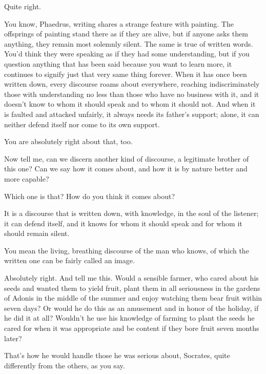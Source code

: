 \sayphaedrus Quite right.

\saysocrates You know, Phaedrus, writing shares a strange feature with
painting. The offsprings of painting stand there as if they are alive,
but if anyone asks them anything, they remain most solemnly silent. The
same is true of written words. You'd think they were speaking as if they
had some understanding, but if you question anything that has been said
because you want to learn more, it continues to signify just that very
same thing forever. When it has once been written down, every
discourse roams about everywhere, reaching indiscriminately those with
understanding no less than those who have no business with it, and it
doesn't know to whom it should speak and to whom it should not. And when
it is faulted and attacked unfairly, it always needs its father's
support; alone, it can neither defend itself nor come to its own
support.

\sayphaedrus You are absolutely right about that, too.

\saysocrates Now tell me, can we discern another kind of
discourse, a legitimate brother of this one? Can we say how it comes
about, and how it is by nature better and more capable?

\sayphaedrus Which one is that? How do you think it comes about?

\saysocrates It is a discourse that is written down, with knowledge, in the
soul of the listener; it can defend itself, and it knows for whom it
should speak and for whom it should remain silent.

\sayphaedrus You mean the living, breathing discourse of the man who knows,
of which the written one can be fairly called an image.

\saysocrates Absolutely right. And tell me this. Would a sensible farmer, 
who cared about his seeds and wanted them to yield fruit, plant
them in all seriousness in the gardens of Adonis in the middle of the
summer and enjoy watching them bear fruit within seven days? Or would he
do this as an amusement and in honor of the holiday, if he did it at
all? Wouldn't he use
his knowledge of farming to plant the seeds he cared for when it was
appropriate and be content if they bore fruit seven months later?

\sayphaedrus That's how he would handle those he was serious about, 
Socrates, quite differently from the others, as you say.


